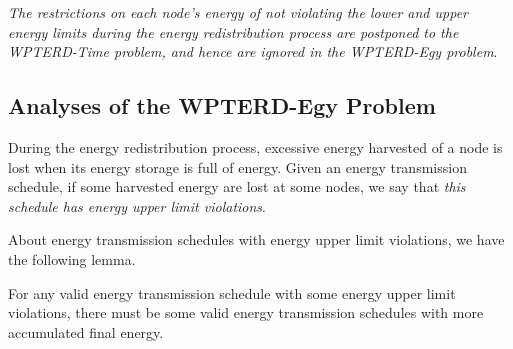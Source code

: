 \documentclass[journal,10pt]{IEEEtran}
\begin{document}
\textit{The restrictions on each node's energy of not violating the lower and upper energy limits during the energy redistribution process are postponed to the WPTERD-Time problem, and hence are ignored in the WPTERD-Egy problem}.

\subsection{Analyses of the WPTERD-Egy Problem}
During the energy redistribution process, excessive energy harvested of a node is lost when its energy storage is full of energy. Given an energy transmission schedule, if some harvested energy are lost at some nodes, we say that \textit{this schedule has energy upper limit violations}.

About energy transmission schedules with energy upper limit violations, we have the following lemma.
\begin{lemma}
\label{lemma_violation}
For any valid energy transmission schedule with some energy upper limit violations, there must be some valid energy transmission schedules with more accumulated final energy.
\end{lemma}
\end{document}
